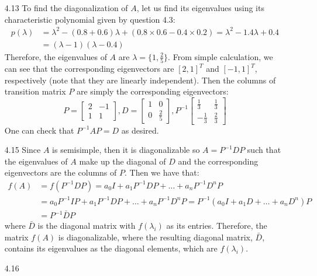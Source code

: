 \documentclass[letterpaper,12pt]{article}
\theoremstyle{definition}
\begin{document}
\begin{enumerate}
\begin{enumerate}
    \end{enumerate}
  \item[4.13]
    To find the diagonalization of $A$, let us find its eigenvalues using its characteristic polynomial given by question 4.3:
    \begin{align*}
      p(\lambda) &= \lambda^2-(0.8+0.6)\lambda+(0.8\times0.6-0.4\times0.2) = \lambda^2-1.4\lambda+0.4 \\
      &= (\lambda-1)(\lambda-0.4)
    \end{align*}
    Therefore, the eigenvalues of $A$ are $\lambda=\{1,\frac{2}{5}\}$. From simple calculation, we can see that the corresponding eigenvectors are $[2,1]^T$ and $[-1,1]^T$, respectively (note that they are linearly independent). Then the columns of transition matrix $P$ are simply the corresponding eigenvectors:
    \[
      P =
      \begin{bmatrix}
        2 & -1 \\
        1 & 1
      \end{bmatrix}
      , D =
      \begin{bmatrix}
        1 & 0 \\
        0 & \frac{2}{5}
      \end{bmatrix}
      , P^{-1}
      \begin{bmatrix}
        \frac{1}{3} & \frac{1}{3} \\
        -\frac{1}{3} & \frac{2}{3}
      \end{bmatrix}
    \]
    One can check that $P^{-1}AP = D$ as desired.
  \item[4.15]
    Since $A$ is semisimple, then it is diagonalizable so $A = P^{-1}DP$ such that the eigenvalues of $A$ make up the diagonal of $D$ and the corresponding eigenvectors are the columns of $P$. Then we have that:
      \begin{align*}
        f(A)&=f(P^{-1}DP)=a_0I + a_1P^{-1}DP+\dots+a_nP^{-1}D^nP \\
        &= a_0P^{-1}IP + a_1P^{-1}DP+\dots+a_nP^{-1}D^nP = P^{-1}(a_0I+a_1D+\dots+a_nD^n)P \\
        &=P^{-1}\bar{D}P
      \end{align*}
    where $\bar{D}$ is the diagonal matrix with $f(\lambda_i)$ as its entries. Therefore, the matrix $f(A)$ is diagonalizable, where the resulting diagonal matrix, $\bar{D}$, contains its eigenvalues as the diagonal elements, which are $f(\lambda_i)$.
  \item[4.16]
    \begin{enumerate}

\end{enumerate}
\end{enumerate}
\end{document}
